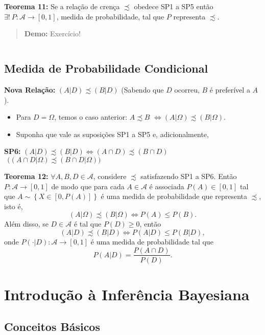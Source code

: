 \documentclass[
]{book}
\begin{document}
\(~\)

\textbf{Teorema 11:} Se a relação de crença \(\precsim\) obedece SP1 a SP5 então \(\exists !~ P: \mathcal{A} \rightarrow [0,1]\), medida de probabilidade, tal que \(P\) representa \(\precsim\).

\begin{quote}
\textbf{Demo:} Exercício!
\end{quote}

\(~\)

\hypertarget{medida-de-probabilidade-condicional}{%
\section{Medida de Probabilidade Condicional}\label{medida-de-probabilidade-condicional}}

\textbf{Nova Relação:} \((A|D) \precsim (B|D)\) (Sabendo que \(D\) ocorreu, \(B\) é preferível a \(A\)).

\begin{itemize}
\item
  Para \(D = \Omega\), temos o caso anterior: \(A \precsim B\) \(\Leftrightarrow (A|\Omega) \precsim (B|\Omega)\).
\item
  Suponha que vale as suposições SP1 a SP5 e, adicionalmente,
\end{itemize}

\textbf{SP6:} \((A|D) \precsim (B|D) \Leftrightarrow (A \cap D) \precsim (B \cap D)\) \(~~\Big( (A \cap D|\Omega) \precsim (B \cap D|\Omega) \Big)\)

\textbf{Teorema 12:} \(\forall A, B, D \in \mathcal{A}\), considere \(\precsim\) satisfazendo SP1 a SP6. Então \(P: \mathcal{A} \rightarrow [0,1]\) de modo que para cada \(A \in \mathcal{A}\) é associada \(P(A) \in [0,1]\) tal que \(A \sim \left\{X \in \left[0,P(A)\right]\right\}\) é uma medida de probabilidade que representa \(\precsim\), isto é, \[(A|\Omega) \precsim (B|\Omega) \Leftrightarrow P(A) \leq P(B).\] Além disso, se \(D \in \mathcal{A}\) é tal que \(P(D) \geq 0\), então \[(A|D) \precsim (B|D) \Leftrightarrow P(A|D) \leq P(B|D),\] onde \(P(\cdot|D): \mathcal{A} \rightarrow [0,1]\) é uma medida de probabilidade tal que
\[P(A|D) = \frac{P(A \cap D)}{P(D)}.\]

\hypertarget{Bayes}{%
\chapter{Introdução à Inferência Bayesiana}\label{Bayes}}

\hypertarget{BasBayes}{%
\section{Conceitos Básicos}\label{BasBayes}}
\end{document}
